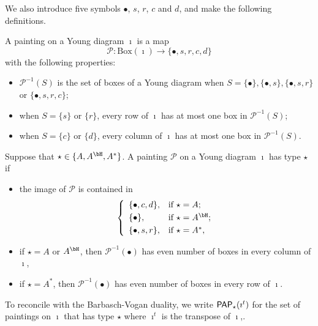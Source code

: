 \documentclass[counting_main.tex]{subfiles}
\begin{document}

\renewcommand{\CP}{\mathcal{P}} We also introduce five symbols $\bullet$, $s$,
$r$, $c$ and $d$, and make the following definitions.
\begin{defn}
  A painting on a Young diagram $\imath$ is a map
  \[
    \mathcal P: \mathrm{Box}(\imath) \rightarrow \{\bullet, s, r, c, d \}
  \]
  with the following properties:
  \begin{itemize}
    \item $\mathcal P^{-1}(S)$ is the set of boxes of a Young diagram when
          $S=\{\bullet\}, \{\bullet, s \}, \{\bullet, s, r\}$ or
          $\{\bullet, s, r, c \} $;
    \item when $S=\{s\}$ or $ \{r\}$, every row of $\imath$ has at most one box
          in $\CP^{-1}(S)$;
    \item when $S=\{c\}$ or $ \{d \}$, every column of $\imath$ has at most one
          box in $\CP^{-1}(S)$.
  \end{itemize}
\end{defn}



\begin{defn}\label{defpbp0}
  Suppose that $\star\in \{A, A^\bH, A^*\}$. A painting $\CP$ on a Young diagram
  $\imath$ has type $\star$ if
  \begin{itemize}
    \item the image of $\CP$ is contained in
          \[
          \left\{
          \begin{array}{ll}
            \{\bullet, c, d\}, &\hbox{if $\star=A$}; \smallskip\\
            \{\bullet\}, &\hbox{if $\star=A^\bH$}; \smallskip\\
            \{\bullet, s, r\}, &\hbox{if $\star=A^*$},            \end{array}
        \right.
          \]
    \item if $\star=A$ or $A^\bH$, then $\CP^{-1}(\bullet)$ has even number of
          boxes in every column of $\imath$,
    \item if $\star=A^*$, then $\CP^{-1}(\bullet)$ has even number of boxes in
          every row of $\imath$.
  \end{itemize}
  To reconcile with the Barbasch-Vogan duality, we write $\mathsf{PAP}_\star(\imath^{t})$
  for the set of paintings on $\imath$ that has type $\star$ where $\imath^{t}$
  is the transpose of $\imath$,.

\end{defn}
\end{document}
